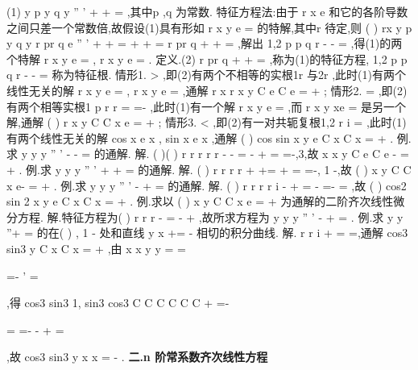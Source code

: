 (1)
y
p y
q y
''
'
+
+
=
,其中p ,q 为常数. 
\textcolor{lyred}{特征方程法}:由于
r x
e \cdots 和它的各阶导数之间只差一个常数倍,故假设(1)具有形如 
r x
y
e \cdots 
=
的特解,其中r 待定,则
(
)
rx
y
p y
q y
r
pr
q e
''
'
+
+
=
\Leftrightarrow 
+
+
=
\Leftrightarrow  
r
pr
q
+
+
=
,解出
1,2
p
p
q
r
-
\pm 
-
=
,得(1)的两个特解
r x
y
e
=
,
r x
y
e
=
. 
\textcolor{lyred}{定义}.(2)
r
pr
q
+
+
=
,称为(1)的\textcolor{lyred}{特征方程},
1,2
p
p
q
r
-
\pm 
-
=
称为\textcolor{lyred}{特征根}. 
\textcolor{lyred}{情形1}.
\Delta >
,即(2)有两个不相等的实根1r 与2r ,此时(1)有两个线性无关的解 
r x
y
e
=
,
r x
y
e
=
,通解
r x
r x
y
C e
C e
=
+
; 
\textcolor{lyred}{情形2}.
\Delta =
,即(2)有两个相等实根1
p
r
r
=
=-
,此时(1)有一个解
r x
y
e
=
,而 
r x
y
xe
=
是另一个解,通解
(
)
r x
y
C
C x e
=
+
; 
\textcolor{lyred}{情形3}.
\Delta <
,即(2)有一对共轭复根1,2
r
i
\alpha 
\beta 
=
\pm 
,此时(1)有两个线性无关的解 
cos
x
e
x
\alpha 
\beta ,
sin
x
e
x
\alpha 
\beta ,通解
(
)
cos
sin
x
y
e
C
x
C
x
\alpha 
\beta 
\beta 
=
+
. 
\textcolor{lyred}{例}.求
y
y
y
''
'
-
-
=
的通解. 
解.
(
)(
)
r
r
r
r
r
-
-
=
\Rightarrow 
-
+
=
\Rightarrow 
=-,3,故
x
x
y
C e
C e
-
=
+
. 
\textcolor{lyred}{例}.求
y
y
y
''
'
+
+
=
的通解. 
解.
(
)
r
r
r
r
+
+=
\Rightarrow 
+
=
\Rightarrow 
=-, 1
-,故
(
)
x
y
C
C x e-
=
+
. 
\textcolor{lyred}{例}.求
y
y
y
''
'
-
+
=
的通解. 
解.
(
)
r
r
r
r
i
-
+
=
\Rightarrow 
-
=-\Rightarrow 
=\pm 
,故
(
)
cos2
sin 2
x
y
e
C
x
C
x
=
+
. 
\textcolor{lyred}{例}.求以
(
)
x
y
C
C x e
=
+
为通解的二阶齐次线性微分方程. 
解.特征方程为(
)
r
r
r
-
=
-
+
,故所求方程为
y
y
y
''
'
-
+
=
. 
\textcolor{lyred}{例}.求
y
y
''+
=
的在(
)
, 1
\pi -
处和直线
y
x
\pi 
+=
-
相切的积分曲线. 
解.
r
r
i
+
=
\Rightarrow 
=\pm \cdots ,通解
cos3
sin3
y
C
x
C
x
=
+
,由
x
x
y
y
\pi 
\pi 
=
=

=-
'
=

,得 
cos3
sin3
1,
sin3
cos3
C
C
C
C
C
C
\pi 
\pi 
\pi 
\pi 
+
=-

\Rightarrow 
=
=-
-
+
=

,故
cos3
sin3
y
x
x
=
-
. 
\vspace{4pt}
{\bfseries \textcolor{lyred}{二.n 阶常系数齐次线性方程}}

